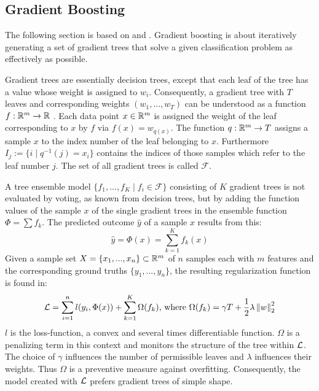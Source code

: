 \subsection{Gradient Boosting}


The following section is based on \cite{Chen16} and \cite{Murphy}. Gradient boosting is about iteratively generating a set of gradient trees that solve a given classification problem as effectively as possible.

Gradient trees are essentially decision trees, except that each leaf of the tree has a value whose weight is assigned to $w_i$. Consequently, a gradient tree with $T$ leaves and corresponding weights $(w_1, ... ,w_T)$ can be understood as a function $f: \mathbb{R}^m \to \mathbb{R}$ . Each data point $x \in \mathbb{R}^m$ is assigned the weight of the leaf corresponding to $x$ by $f$ via $f(x) = w_{q(x)}$. The function $q: \mathbb{R}^m \to T$ assigns a sample $x$ to the index number of the leaf belonging to $x$. Furthermore $I_j := \{ i \mid q^{-1}(j)=x_i \}$ contains the indices of those samples which refer to the leaf number $j$. The set of all gradient trees is called $\mathcal{F}$.

A tree ensemble model $\{f_1, ... ,f_K \mid f_i \in \mathcal{F}\}$ consisting of $K$ gradient trees is not evaluated by voting, as known from decision trees, but by adding the function values of the sample $x$ of the single gradient trees in the ensemble function $\Phi = \sum f_k$. The predicted outcome $\hat{y}$ of a sample $x$ results from this:
$$\hat{y} = \Phi(x) = \sum_{k=1}^{K} f_k(x)$$
Given a sample set $X= \{x_1, ..., x_n\} \subset \mathbb{R}^{m} $ of $n$ samples each with $m$ features and the corresponding ground truths $\{y_1, ... ,y_n\}$, the resulting regularization function is found in:	
$$\mathcal{L} = \sum_{i=1}^{n} l(y_i, \Phi(x)) + \sum_{k=1}^{K}\Omega(f_k) \text{,  where } \Omega(f_k) = \gamma T + \frac{1}{2}\lambda \left\| w \right\|_2^2$$
$l$ is the loss-function, a convex and several times differentiable function. $\Omega$ is a penalizing term in this context and monitors the structure of the tree within $\mathcal{L}$. The choice of $\gamma$ influences the number of permissible leaves and $\lambda$ influences their weights. Thus $\Omega$ is a preventive measure against overfitting. Consequently, the model created with $\mathcal{L}$ prefers gradient trees of simple shape.

